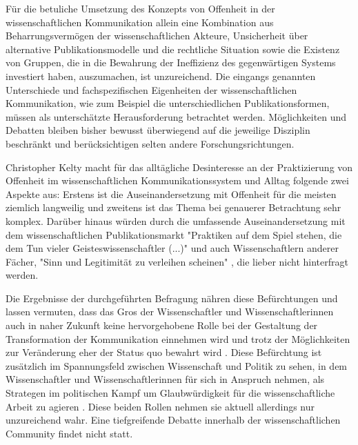 Für die betuliche Umsetzung des Konzepts von Offenheit in der wissenschaftlichen Kommunikation allein eine Kombination aus Beharrungsvermögen der wissenschaftlichen Akteure, Unsicherheit über alternative Publikationsmodelle und die rechtliche Situation sowie die Existenz von Gruppen, die in die Bewahrung der Ineffizienz des gegenwärtigen Systems investiert haben, auszumachen, ist unzureichend. Die eingangs genannten Unterschiede und fachspezifischen Eigenheiten der wissenschaftlichen Kommunikation, wie zum Beispiel die unterschiedlichen Publikationsformen, müssen als unterschätzte Herausforderung betrachtet werden. Möglichkeiten und Debatten bleiben bisher bewusst überwiegend auf die jeweilige Disziplin beschränkt und berücksichtigen selten andere Forschungsrichtungen.

Christopher Kelty macht für das alltägliche Desinteresse an der Praktizierung von Offenheit im wissenschaftlichen Kommunikationssystem und Alltag folgende zwei Aspekte aus: Erstens ist die Auseinandersetzung mit Offenheit für die meisten ziemlich langweilig und zweitens ist das Thema bei genauerer Betrachtung sehr komplex. Darüber hinaus würden durch die umfassende Auseinandersetzung mit dem wissenschaftlichen Publikationsmarkt "Praktiken auf dem Spiel stehen, die dem Tun vieler Geisteswissenschaftler (...)" und auch Wissenschaftlern anderer Fächer, "Sinn und Legitimität zu verleihen scheinen" \cite{Hirschi_2015}, die lieber nicht hinterfragt werden.

Die Ergebnisse der durchgeführten Befragung nähren diese Befürchtungen und lassen vermuten, dass das Gros der Wissenschaftler und Wissenschaftlerinnen auch in naher Zukunft keine hervorgehobene Rolle bei der Gestaltung der Transformation der Kommunikation einnehmen wird und trotz der Möglichkeiten zur Veränderung eher der Status quo bewahrt wird \cite{Nosek_2012}. Diese Befürchtung ist zusätzlich im Spannungsfeld zwischen Wissenschaft und Politik zu sehen, in dem Wissenschaftler und Wissenschaftlerinnen für sich in Anspruch nehmen, als Strategen im politischen Kampf um Glaubwürdigkeit für die wissenschaftliche Arbeit zu agieren \cite{Latour_2013}. Diese beiden Rollen nehmen sie aktuell allerdings nur unzureichend wahr. Eine tiefgreifende Debatte innerhalb der wissenschaftlichen Community findet nicht statt.

